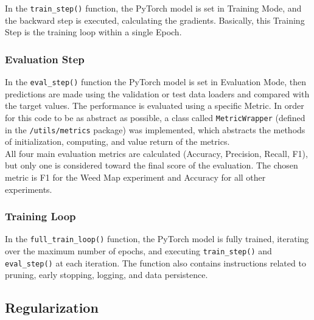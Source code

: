 In the \texttt{train\_step()} function, the PyTorch model is set in Training Mode, and the backward step is executed, calculating the gradients.
Basically, this Training Step is the training loop within a single Epoch.

\subsubsection{Evaluation Step}

In the \texttt{eval\_step()} function the PyTorch model is set in Evaluation Mode, then predictions are made using the validation or test data loaders and compared with the target values.
The performance is evaluated using a specific Metric. In order for this code to be as abstract as possible, a class called \texttt{MetricWrapper} (defined in the \texttt{/utils/metrics} package) was implemented, which abstracts the methods of initialization, computing, and value return of the metrics.
\\[0.3cm]All four main evaluation metrics are calculated (Accuracy, Precision, Recall, F1), but only one is considered toward the final score of the evaluation. The chosen metric is F1 for the Weed Map experiment and Accuracy for all other experiments.

\subsubsection{Training Loop}

In the \texttt{full\_train\_loop()} function, the PyTorch model is fully trained, iterating over the maximum number of epochs, and executing \texttt{train\_step()} and \texttt{eval\_step()} at each iteration.
The function also contains instructions related to pruning, early stopping, logging, and data persistence.

\subsection{Regularization}

